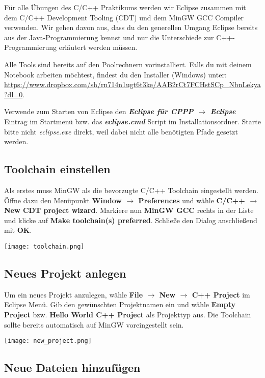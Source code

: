 Für alle Übungen des C/C++ Praktikums werden wir Eclipse zusammen mit dem C/C++ Development Tooling (CDT) und dem MinGW GCC Compiler verwenden.
Wir gehen davon aus, dass du den generellen Umgang Eclipse bereits aus der Java-Programmierung kennst und nur die Unterschiede zur C++-Programmierung erläutert werden müssen.

Alle Tools sind bereits auf den Poolrechnern vorinstalliert.
Falls du mit deinem Notebook arbeiten möchtest, findest du den Installer (Windows) unter: \url{https://www.dropbox.com/sh/rn714n1ugt6t3ke/AAB2rCt7FCHstSCp_NbnLekya?dl=0}.

Verwende zum Starten von Eclipse den \textbf{\emph{Eclipse für CPPP $\rightarrow$ Eclipse}} Eintrag im Startmenü bzw. das \textbf{\emph{eclipse.cmd}} Script im Installationsordner.
Starte bitte nicht \emph{eclipse.exe} direkt, weil dabei nicht alle benötigten Pfade gesetzt werden.

\subsection{Toolchain einstellen}

Als erstes muss MinGW als die bevorzugte C/C++ Toolchain eingestellt werden.
Öffne dazu den Menüpunkt \textbf{Window $\rightarrow$   Preferences} und wähle \textbf{C/C++ $\rightarrow$  New CDT project wizard}.
Markiere nun \textbf{MinGW GCC} rechts in der Liste und klicke auf \textbf{Make toolchain(s) preferred}.
Schließe den Dialog anschließend mit \textbf{OK}.

\texttt{[image: toolchain.png]}

\subsection{Neues Projekt anlegen}
Um ein neues Projekt anzulegen, wähle \textbf{File $\rightarrow$ New $\rightarrow$ C++ Project} im Eclipse Menü.
Gib den gewünschten Projektnamen ein und wähle \textbf{Empty Project} bzw. \textbf{Hello World C++ Project} als Projekttyp aus.
Die Toolchain sollte bereits automatisch auf MinGW voreingestellt sein.

\begin{center}
	\texttt{[image: new\_project.png]}
\end{center}

\subsection{Neue Dateien hinzufügen}

